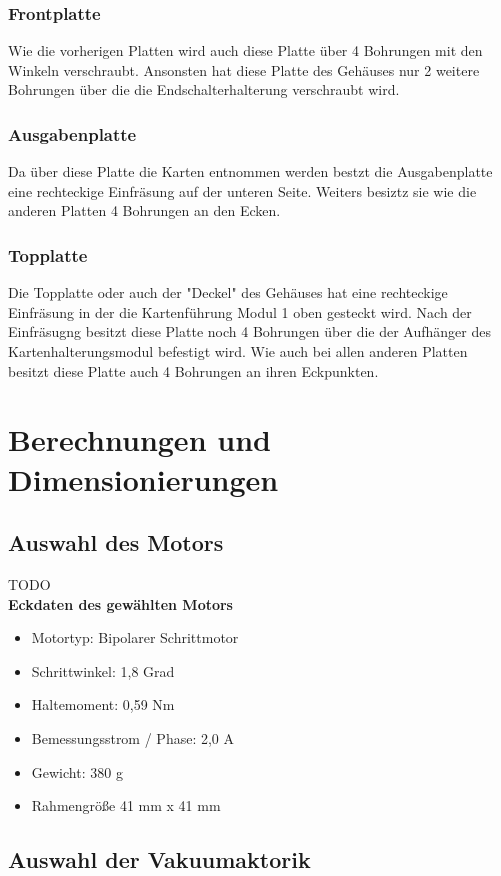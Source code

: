 \subsubsection{Frontplatte}
Wie die vorherigen Platten wird auch diese Platte über 4 Bohrungen mit den Winkeln verschraubt.
Ansonsten hat diese Platte des Gehäuses nur 2 weitere Bohrungen über die die Endschalterhalterung verschraubt wird.

\subsubsection{Ausgabenplatte}
Da über diese Platte die Karten entnommen werden bestzt die Ausgabenplatte eine rechteckige Einfräsung auf der unteren
Seite.
Weiters besiztz sie wie die anderen Platten 4 Bohrungen an den Ecken.

\subsubsection{Topplatte}
Die Topplatte oder auch der "Deckel" des Gehäuses hat eine rechteckige Einfräsung in der die Kartenführung Modul 1 oben
gesteckt wird. Nach der Einfräsugng besitzt diese Platte noch 4 Bohrungen über die der Aufhänger des Kartenhalterungsmodul
befestigt wird.
Wie auch bei allen anderen Platten besitzt diese Platte auch 4 Bohrungen an ihren Eckpunkten.

\section{Berechnungen und Dimensionierungen}
\subsection{Auswahl des Motors}
TODO\\
\textbf{Eckdaten des gewählten Motors}
\begin{itemize}
    \item Motortyp: Bipolarer Schrittmotor
    \item Schrittwinkel: 1,8 Grad
    \item Haltemoment: 0,59 Nm
    \item Bemessungsstrom / Phase: 2,0 A
    \item Gewicht: 380 g
    \item Rahmengröße 41 mm x 41 mm
\end{itemize}
\subsection{Auswahl der Vakuumaktorik}
